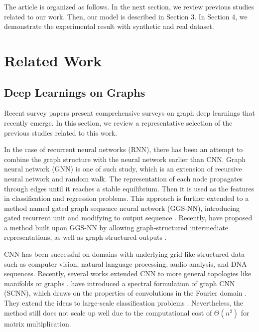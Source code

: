 \documentclass{article}
\begin{document}
The article is organized as follows. 
In the next section, we review previous studies related to our work.
Then, our model is described in Section 3. In Section 4, we demonstrate the experimental result with synthetic and real dataset.


\section{Related Work}

\subsection{Deep Learnings on Graphs}
Recent survey papers \cite{niepert2016learning,bronstein2017geometric} present comprehensive surveys on graph deep learnings that recently emerge. In this section, we review a representative selection of the previous studies related to this work.

In the case of recurrent neural networks (RNN), there has been an attempt \cite{scarselli2009graph} to combine the graph structure with the neural network earlier than CNN. Graph neural network (GNN) is one of such study, which is an extension of recursive neural network and random walk. The representation of each node propagates through edges until it reaches a stable equilibrium. Then it is used as the features in classification and regression problems. This approach is further extended to a method named gated graph sequence neural network (GGS-NN), introducing gated recurrent unit and modifying to output sequence \cite{li2015gated}. 
Recently, \citeauthor{johnson2016learning} have proposed a method built upon GGS-NN by allowing graph-structured intermediate representations, as well as graph-structured outputs \cite{johnson2016learning}.

CNN has been successful on domains with underlying grid-like structured data such as computer vision, natural language processing, audio analysis, and DNA sequences. Recently, several works extended CNN to more general topologies like manifolds or graphs \cite{bruna2013spectral,henaff2015deep,niepert2016learning,defferrard2016convolutional}. \citeauthor{bruna2013spectral} have introduced a spectral formulation of graph CNN (SCNN), which draws on the properties of convolutions in the Fourier domain \cite{bruna2013spectral}. They extend the ideas to large-scale classification problems \cite{henaff2015deep}. Nevertheless, the method still does not scale up well due to the computational cost of $\Theta(n^2)$ for matrix multiplication.
\end{document}

